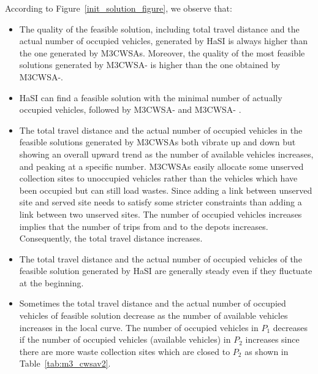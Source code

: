\documentclass[journal]{IEEEtran}
\begin{document}
According to Figure~\ref{init_solution_figure}, we observe that:
\begin{itemize}%
	\item \label{init_ca} The quality of the feasible solution, including total travel distance and the actual number of occupied vehicles, generated by HaSI is always higher than the one generated by M3CWSAs. Moreover, the quality of the most feasible solutions generated by M3CWSA-\uppercase\expandafter{} is higher than the one obtained by M3CWSA-\uppercase\expandafter{}.
	
	\item \label{init_cb} HaSI can find a feasible solution with the minimal number of actually occupied vehicles, followed by M3CWSA-\uppercase\expandafter{} and M3CWSA- \uppercase\expandafter{}.
	
	\item \label{init_cc} The total travel distance and the actual number of occupied vehicles in the feasible solutions generated by M3CWSAs both vibrate up and down but showing an overall upward trend as the number of available vehicles increases, and peaking at a specific number. M3CWSAs easily allocate some unserved collection sites to unoccupied vehicles rather than the vehicles which have been occupied but can still load wastes. Since adding a link between unserved site and served site needs to satisfy some stricter constraints than adding a link between two unserved sites. The number of occupied vehicles increases implies that the number of trips from and to the depots increases. Consequently, the total travel distance increases.
	\item \label{init_cd} The total travel distance and the actual number of occupied vehicles of the feasible solution generated by HaSI are generally steady even if they fluctuate at the beginning.
	\item  Sometimes the total travel distance and the actual number of occupied vehicles of feasible solution decrease as the number of available vehicles increases in the local curve. The number of occupied vehicles in $P_1$ decreases if the number of occupied vehicles (available vehicles) in $P_2$ increases since there are more waste collection sites which are closed to $P_2$ as shown in Table~\ref{tab:m3_cwsav2}.
\end{itemize}

\end{document}
